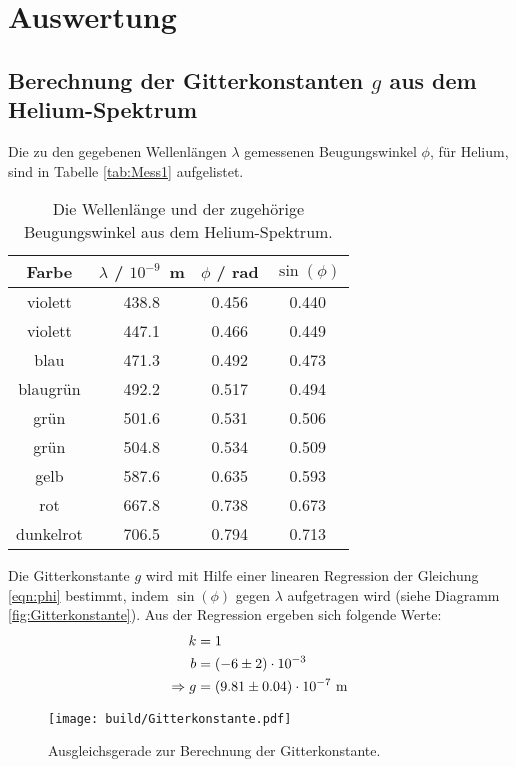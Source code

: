\section{Auswertung}
\label{sec:Auswertung}

\subsection{Berechnung der Gitterkonstanten $g$ aus dem Helium-Spektrum}
Die zu den gegebenen Wellenlängen $\lambda$ gemessenen Beugungswinkel $\phi$, für Helium, sind in Tabelle \eqref{tab:Mess1} aufgelistet.

\begin{table}[H] %
  \centering
  \begin{tabular}{c| c c c}
    \toprule
    Farbe & $\lambda$ / $10^{-9}$\, m & $\phi$ / rad & $\sin(\phi)$ \\
    \midrule
      violett   & 438.8 & 0.456 & 0.440 \\
      violett   & 447.1 & 0.466 & 0.449 \\
      blau      & 471.3 & 0.492 & 0.473 \\
      blaugrün  & 492.2 & 0.517 & 0.494 \\
      grün      & 501.6 & 0.531 & 0.506 \\
      grün      & 504.8 & 0.534 & 0.509 \\
      gelb      & 587.6 & 0.635 & 0.593 \\
      rot       & 667.8 & 0.738 & 0.673 \\
      dunkelrot & 706.5 & 0.794 & 0.713 \\
    \bottomrule
  \end{tabular}
  \caption{Die Wellenlänge und der zugehörige Beugungswinkel aus dem Helium-Spektrum.}
  \label{tab:Mess1}
\end{table}

Die Gitterkonstante $g$ wird mit Hilfe einer linearen Regression der Gleichung \eqref{eqn:phi} bestimmt, indem $\sin(\phi)$ gegen $\lambda$ aufgetragen wird (siehe Diagramm \eqref{fig:Gitterkonstante}). Aus der Regression ergeben sich folgende Werte:
\begin{align*}
  k & = 1 \\
  b & = (\num{-6 +- 2}) \cdot 10^{-3} \\
  \Rightarrow g & = (\num{9.81 +- 0.04}) \cdot 10^{-7}\ \text{m}
\end{align*}

\begin{figure}[H]
  \centering
  \texttt{[image: build/Gitterkonstante.pdf]}
  \caption{Ausgleichsgerade zur Berechnung der Gitterkonstante.}
  \label{fig:Gitterkonstante}
\end{figure}

